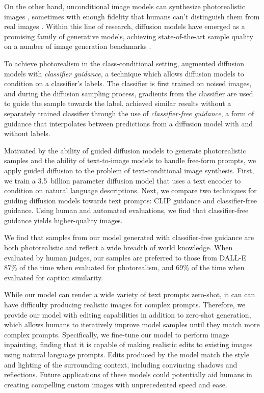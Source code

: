 On the other hand, unconditional image models can synthesize photorealistic images \cite{biggan,stylegan,stylegan2,vqvae2}, sometimes with enough fidelity that humans can't distinguish them from real images \cite{zhou2019hype}. Within this line of research, diffusion models \cite{dickstein,scorematching} have emerged as a promising family of generative models, achieving state-of-the-art sample quality on a number of image generation benchmarks \citep{ddpm,sotapaper,cascaded}.

To achieve photorealism in the class-conditional setting, \citet{sotapaper} augmented diffusion models with \textit{classifier guidance}, a technique which allows diffusion models to condition on a classifier's labels. The classifier is first trained on noised images, and during the diffusion sampling process, gradients from the classifier are used to guide the sample towards the label. \citet{uncond} achieved similar results without a separately trained classifier through the use of \textit{classifier-free guidance}, a form of guidance that interpolates between predictions from a diffusion model with and without labels.

Motivated by the ability of guided diffusion models to generate photorealistic samples and the ability of text-to-image models to handle free-form prompts, we apply guided diffusion to the problem of text-conditional image synthesis. First, we train a 3.5~billion parameter diffusion model that uses a text encoder to condition on natural language descriptions. Next, we compare two techniques for guiding diffusion models towards text prompts: CLIP guidance and classifier-free guidance. Using human and automated evaluations, we find that classifier-free guidance yields higher-quality images.

We find that samples from our model generated with classifier-free guidance are both photorealistic and reflect a wide breadth of world knowledge. When evaluated by human judges, our samples are preferred to those from DALL-E \citep{dalle} 87\% of the time when evaluated for photorealism, and 69\% of the time when evaluated for caption similarity.  

While our model can render a wide variety of text prompts zero-shot, it can can have difficulty producing realistic images for complex prompts. Therefore, we provide our model with editing capabilities in addition to zero-shot generation, which allows humans to iteratively improve model samples until they match more complex prompts. Specifically, we fine-tune our model to perform image inpainting, finding that it is capable of making realistic edits to existing images using natural language prompts. Edits produced by the model match the style and lighting of the surrounding context, including convincing shadows and reflections. Future applications of these models could potentially aid humans in creating compelling custom images with unprecedented speed and ease.

